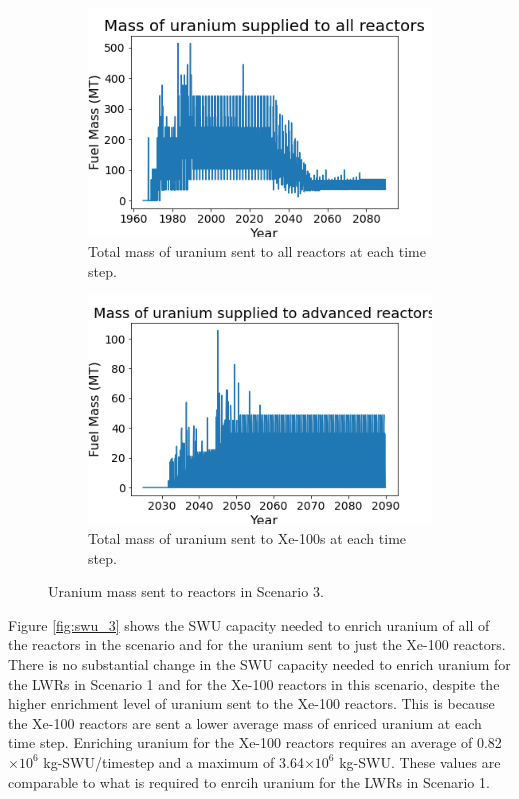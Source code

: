 \begin{figure}
    \centering
    \begin{subfigure}{0.4\textwidth}
        \centering
        \includegraphics[scale=0.3]{figures/fuelsupply_scenarios_3.png}
        \caption{Total mass of uranium sent to all reactors at each time step.}
        \label{fig:totalfuel_3}
    \end{subfigure}
    \begin{subfigure}{0.4\textwidth}
        \centering
        \includegraphics[scale=0.3]{figures/advancedRX_fuelsupply_scenarios_3.png}
        \caption{Total mass of uranium sent to Xe-100s at each time step.}
        \label{fig:haleu_3}
    \end{subfigure}
    \caption{Uranium mass sent to reactors in Scenario 3.}
    \label{fig:fuel_3}
\end{figure}

Figure \ref{fig:swu_3} shows the \gls{SWU} capacity needed to enrich 
uranium of all of the reactors in the scenario and for the uranium sent 
to just the Xe-100 reactors. There is no substantial change in the 
\gls{SWU} capacity needed to enrich uranium for the \glspl{LWR} in 
Scenario 1 and for the Xe-100 
reactors in this scenario, despite the higher enrichment level of uranium 
sent to the Xe-100 reactors. This is because the Xe-100 reactors are sent 
a lower average mass of enriced uranium at each time step. Enriching uranium 
for the Xe-100 reactors requires an average of 
0.82$\times 10^6$ kg-\gls{SWU}/timestep and a maximum of 3.64$\times 10^6$
kg-\gls{SWU}. These values are comparable to what is required to enrcih 
uranium for the \glspl{LWR} in Scenario 1. 

